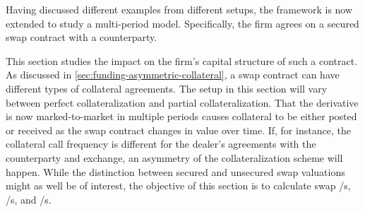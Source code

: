 \documentclass[main.tex]{subfiles}
\begin{document}
    Having discussed different examples from different setups,
    the framework is now extended to study a multi-period model.
    Specifically, the firm agrees on a secured swap contract with a counterparty.
    
    This section studies the impact on the firm's capital structure of such a contract.
    As discussed in \cref{sec:funding-asymmetric-collateral}, a swap contract can have different types of collateral agreements.
    The setup in this section will vary between perfect collateralization and partial collateralization.
    That the derivative is now marked-to-market in multiple periods causes collateral to be either posted or received as the swap contract changes in value over time.
    If, for instance, the collateral call frequency is different for the dealer's agreements with the counterparty and exchange, an asymmetry of the collateralization scheme will happen.
    While the distinction between secured and unsecured swap valuations might as well be of interest,
    the objective of this section is to calculate swap \FVA/s, \CVA/s, and \DVA/s.

\end{document}
